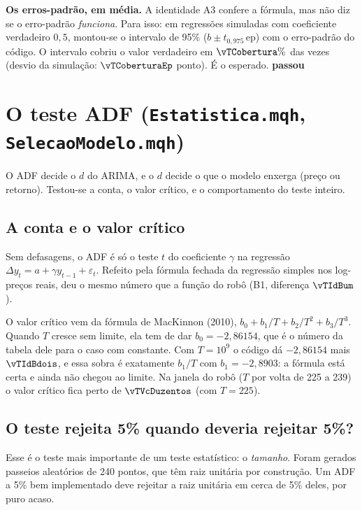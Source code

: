 \documentclass[11pt,a4paper]{article}
\newcommand{\ok}{\textcolor{cok}{\textbf{passou}}}
\begin{document}
\textbf{Os erros-padrão, em média.} A identidade A3 confere a fórmula, mas não diz se o erro-padrão
\emph{funciona}. Para isso: em \vTCoberturaR{} regressões simuladas com coeficiente verdadeiro $0{,}5$, montou-se
o intervalo de 95\% ($b \pm t_{0{,}975}\,\mathrm{ep}$) com o erro-padrão do código. O intervalo cobriu o valor
verdadeiro em $\vTCobertura\%$ das vezes (desvio da simulação: $\vTCoberturaEp$ ponto). É o esperado. \ok

\section{O teste ADF (\texttt{Estatistica.mqh}, \texttt{SelecaoModelo.mqh})}\label{sec:adf}

O ADF decide o $d$ do ARIMA, e o $d$ decide o que o modelo enxerga (preço ou retorno). Testou-se a conta, o valor
crítico, e o comportamento do teste inteiro.

\subsection{A conta e o valor crítico}

Sem defasagens, o ADF é só o teste $t$ do coeficiente $\gamma$ na regressão $\Delta y_t = a + \gamma y_{t-1} +
\varepsilon_t$. Refeito pela fórmula fechada da regressão simples nos log-preços reais, deu o mesmo número que a
função do robô (B1, diferença $\vTIdBum$).

O valor crítico vem da fórmula de MacKinnon (2010), $b_0 + b_1/T + b_2/T^2 + b_3/T^3$. Quando $T$ cresce sem
limite, ela tem de dar $b_0 = -2{,}86154$, que é o número da tabela dele para o caso com constante. Com
$T = 10^9$ o código dá $-2{,}86154$ mais $\vTIdBdois$, e essa sobra é exatamente $b_1/T$ com $b_1 = -2{,}8903$:
a fórmula está certa e ainda não chegou ao limite. Na janela do robô ($T$ por volta de 225 a 239) o valor crítico
fica perto de $\vTVcDuzentos$ (com $T = 225$).

\subsection{O teste rejeita 5\% quando deveria rejeitar 5\%?}

Esse é o teste mais importante de um teste estatístico: o \emph{tamanho}. Foram gerados \vTAdfR{} passeios
aleatórios de 240 pontos, que têm raiz unitária por construção. Um ADF a 5\% bem implementado deve rejeitar a
raiz unitária em cerca de 5\% deles, por puro acaso.
\end{document}
